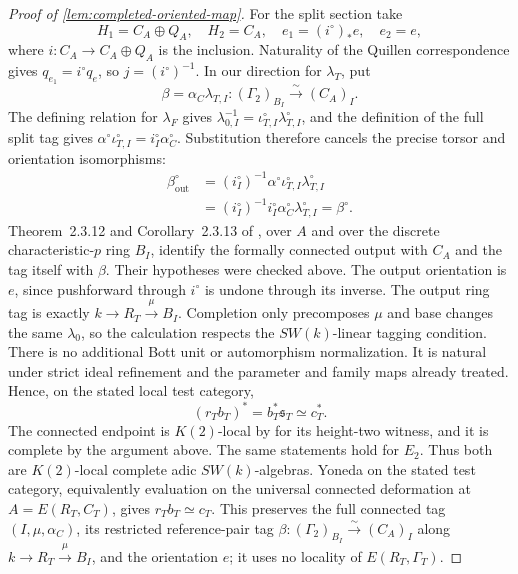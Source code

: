 \begin{proof}[Proof of \cref{lem:completed-oriented-map}]
For the split section take
\[
 H_1=C_A\oplus Q_A,\quad H_2=C_A,\quad
 e_1=(i^\circ)_*e,\quad e_2=e,
\]
where \(i:C_A\to C_A\oplus Q_A\) is the inclusion. Naturality of the
Quillen correspondence gives \(q_{e_1}=i^\circ q_e\), so
\(j=(i^\circ)^{-1}\). In our direction for \(\lambda_T\), put
\[
 \beta=\alpha_C\lambda_{T,I}:
       (\Gamma_2)_{B_I}\xrightarrow{\sim}(C_A)_I .
\]
The defining relation for \(\lambda_F\) gives
\(\lambda_{0,I}^{-1}=\iota_{T,I}^\circ\lambda_{T,I}^\circ\), and the
definition of the full split tag gives
\(\alpha^\circ\iota_{T,I}^\circ=i_I^\circ\alpha_C^\circ\).
Substitution therefore cancels the precise torsor and orientation
isomorphisms:
\[
 \begin{aligned}
 \beta_{\mathrm{out}}^\circ
  &=(i_I^\circ)^{-1}\alpha^\circ
       \iota_{T,I}^\circ\lambda_{T,I}^\circ\\
  &=(i_I^\circ)^{-1}i_I^\circ
       \alpha_C^\circ\lambda_{T,I}^\circ
    =\beta^\circ .
 \end{aligned}
\]
Theorem~2.3.12 and Corollary~2.3.13 of \cite{LurieEllipticII2018}, over
\(A\) and over the discrete characteristic-\(p\) ring \(B_I\), identify
the formally connected output with \(C_A\) and the tag itself with
\(\beta\). Their hypotheses were checked above. The output orientation
is \(e\), since pushforward through \(i^\circ\) is undone through its
inverse. The output ring tag is exactly
\(k\to R_T\xrightarrow{\mu}B_I\). Completion only precomposes \(\mu\)
and base changes the same \(\lambda_0\), so the calculation respects the
\(SW(k)\)-linear tagging condition. There is no additional Bott unit or
automorphism normalization. It is natural under strict ideal refinement
and the parameter and family maps already treated. Hence, on the stated
local test category,
\[
 (r_Tb_T)^*=b_T^*\mathfrak s_T\simeq c_T^*.
\]
The connected endpoint is \(K(2)\)-local by
\cite[Proposition~4.4.2]{BMR2026} for its height-two witness, and it is
complete by the argument above. The same statements hold for \(E_2\).
Thus both are \(K(2)\)-local complete adic \(SW(k)\)-algebras.
Yoneda on the stated test category, equivalently evaluation on the universal connected deformation at
\(A=E(R_T,C_T)\), gives \(r_Tb_T\simeq c_T\). This preserves the full
connected tag \((I,\mu,\alpha_C)\), its restricted reference-pair tag
\(\beta:(\Gamma_2)_{B_I}\xrightarrow{\sim}(C_A)_I\) along
\(k\to R_T\xrightarrow{\mu}B_I\), and the orientation \(e\); it uses
no locality of \(E(R_T,\Gamma_T)\).



\end{proof}

